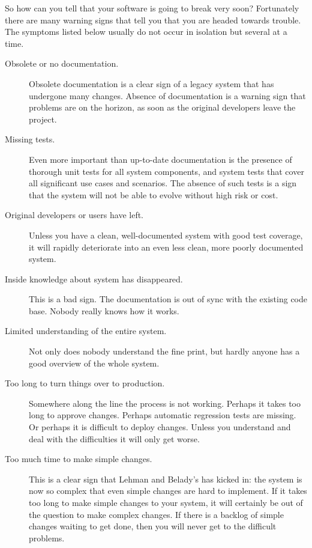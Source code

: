 \documentclass[a4paper,10pt,twoside]{book}
\begin{document}
So how can you tell that your software is going to break very soon? Fortunately there are many warning signs that tell you that you are headed towards trouble. The symptoms listed below usually do not occur in isolation but several at a time. 

\begin{description}
  \item[Obsolete or no documentation.] 
Obsolete documentation is a clear sign of a legacy system that has undergone many changes. Absence of documentation is a warning sign that problems are on the horizon, as soon as the original developers leave the project.

  \item[Missing tests.] 
Even more important than up-to-date documentation is the presence of thorough unit tests for all system components, and system tests that cover all significant use cases and scenarios. The absence of such tests is a sign that the system will not be able to evolve without high risk or cost.

  \item[Original developers or users have left.]
Unless you have a clean, well-documented system with good test coverage, it will rapidly deteriorate into an even less clean, more poorly documented system.

  \item[Inside knowledge about system has disappeared.]
This is a bad sign. The documentation is out of sync with the existing code base. Nobody really knows how it works.

  \item[Limited understanding of the entire system.]
Not only does nobody understand the fine print, but hardly anyone has a good overview of the whole system. 

  \item[Too long to turn things over to production.]
Somewhere along the line the process is not working. Perhaps it takes too long to approve changes. Perhaps automatic regression tests are missing. Or perhaps it is difficult to deploy changes. Unless you understand and deal with the difficulties it will only get worse.

  \item[Too much time to make simple changes.]
This is a clear sign that Lehman and Belady's  has kicked in: the system is now so complex that even simple changes are hard to implement. If it takes too long to make simple changes to your system, it will certainly be out of the question to make complex changes. If there is a backlog of simple changes waiting to get done, then you will never get to the difficult problems.


\end{description}
\end{document}
